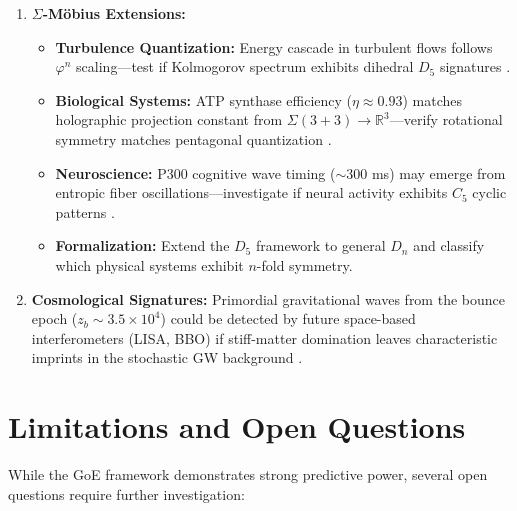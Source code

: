 \documentclass[12pt]{article}
\begin{document}
\begin{enumerate}
\item \textbf{$\Sigma$-M\"obius Extensions:} 
    \begin{itemize}
    \item \textbf{Turbulence Quantization:} Energy cascade in turbulent flows follows $\varphi^n$ scaling—test if Kolmogorov spectrum exhibits dihedral $D_5$ signatures \cite{muller2020kolmogorov}.
    \item \textbf{Biological Systems:} ATP synthase efficiency ($\eta \approx 0.93$) matches holographic projection constant from $\Sigma(3+3) \to \mathbb{R}^3$—verify rotational symmetry matches pentagonal quantization \cite{guo2022rotary}.
    \item \textbf{Neuroscience:} P300 cognitive wave timing ($\sim 300$ ms) may emerge from entropic fiber oscillations—investigate if neural activity exhibits $C_5$ cyclic patterns \cite{friston2010freeenergy}.
    \item \textbf{Formalization:} Extend the $D_5$ framework to general $D_n$ and classify which physical systems exhibit $n$-fold symmetry.
    \end{itemize}

\item \textbf{Cosmological Signatures:} Primordial gravitational waves from the bounce epoch ($z_b \sim 3.5 \times 10^4$) could be detected by future space-based interferometers (LISA, BBO) if stiff-matter domination leaves characteristic imprints in the stochastic GW background \cite{ijjas2019gwsignatures}.
\end{enumerate}

\section{Limitations and Open Questions}
\label{sec:limitations}

While the GoE framework demonstrates strong predictive power, several open questions require further investigation:
\end{document}
